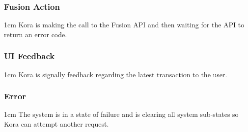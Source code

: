 \documentclass[onecolumn, draftclsnofoot,10pt, compsoc]{IEEEtran}
\newenvironment{indentItem}[1][1cm]{\begin{adjustwidth}{#1}{}}{\end{adjustwidth}}
\begin{document}
	\subsubsection{Fusion Action}
		\begin{indentItem}
			Kora is making the call to the Fusion API and then waiting for the API to return an error code.
		\end{indentItem}
	
	\subsubsection{UI Feedback}
		\begin{indentItem}
			Kora is signally feedback regarding the latest transaction to the user.
		\end{indentItem}
	
	\subsubsection{Error}
		\begin{indentItem}
			The system is in a state of failure and is clearing all system sub-states so Kora can attempt another request.
		\end{indentItem}
	
	
\end{document}
